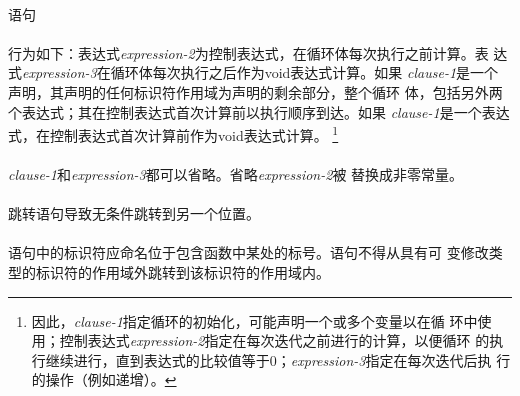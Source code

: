 {\paragraph{}
语句                                                                          \\
\mbox{\hspace{4em}  \tm{;}  \tm{;}
   \tm{)} }                                    \\
行为如下：表达式\textit{expression-2}为控制表达式，在循环体每次执行之前计算。表
达式\textit{expression-3}在循环体每次执行之后作为void表达式计算。如果
\textit{clause-1}是一个声明，其声明的任何标识符作用域为声明的剩余部分，整个循环
体，包括另外两个表达式；其在控制表达式首次计算前以执行顺序到达。如果
\textit{clause-1}是一个表达式，在控制表达式首次计算前作为void表达式计算。
\footnote{因此，\textit{clause-1}指定循环的初始化，可能声明一个或多个变量以在循
环中使用；控制表达式\textit{expression-2}指定在每次迭代之前进行的计算，以便循环
的执行继续进行，直到表达式的比较值等于0；\textit{expression-3}指定在每次迭代后执
行的操作（例如递增）。}

\paragraph{}
\textit{clause-1}和\textit{expression-3}都可以省略。省略\textit{expression-2}被
替换成非零常量。

\syntax
\paragraph{}

\semantic
\paragraph{}
跳转语句导致无条件跳转到另一个位置。

\constraint
\paragraph{}
语句中的标识符应命名位于包含函数中某处的标号。语句不得从具有可
变修改类型的标识符的作用域外跳转到该标识符的作用域内。

}
